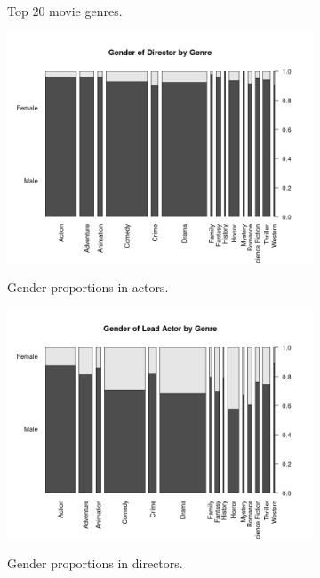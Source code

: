 \documentclass[12pt]{article}
\begin{document}
\begin{figure}[H]
\begin{subfigure}[b]{0.33\textwidth}
\label{fig:sub1}
\caption{Top 20 movie genres.}
\end{subfigure}
\hfill
\begin{subfigure}[b]{0.33\textwidth}
\centering
\includegraphics[width=1\textwidth]{images/george_viz/director_gender_genre_spine_plot.png}
\label{fig:sub1}
\caption{Gender proportions in actors.}
\end{subfigure}
\hfill
\begin{subfigure}[b]{0.32\textwidth}
\centering
\includegraphics[width=1\textwidth]{images/george_viz/genre_gender_spine_plot.png}
\label{fig:sub1}
\caption{Gender proportions in directors.}
\end{subfigure}
\hfill
\begin{subfigure}[b]{0.33\textwidth}

\end{subfigure}
\end{figure}
\end{document}
